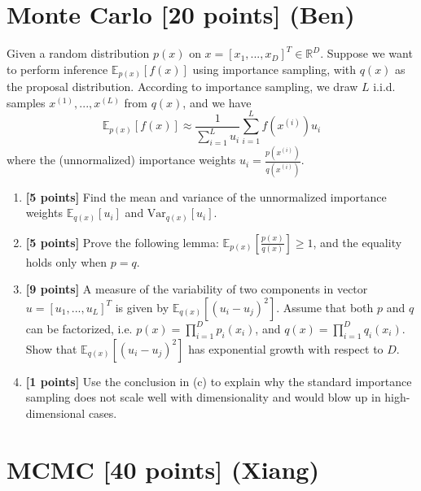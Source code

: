 \documentclass{article}
\begin{document}
\newpage
\section{Monte Carlo [20 points] (Ben)}

Given a random distribution $p(x)$ on $x = [x_1, ..., x_D]^T \in \mathbb{R}^D$. Suppose we want to perform inference $\mathbb{E}_{p(x)}[f(x)]$ using importance sampling, with $q(x)$ as the proposal distribution. According to importance sampling, we draw $L$ i.i.d. samples $x^{(1)}, ..., x^{(L)}$ from $q(x)$, and we have $$\mathbb{E}_{p(x)}[f(x)] \approx \frac{1}{\sum_{i=1}^L u_i}\sum_{i = 1}^{L} f(x^{(i)})u_i$$
where the (unnormalized) importance weights $u_i = \frac{p(x^{(i)})}{q(x^{(i)})}$.

\begin{enumerate}
\item \textbf{[5 points]} Find the mean and variance of the unnormalized importance weights $\mathbb{E}_{q(x)}\left[u_i\right]$ and $\text{Var}_{q(x)}\left[u_i\right]$.

\item \textbf{[5 points]} Prove the following lemma: $\mathbb{E}_{p(x)}\left[\frac{p(x)}{q(x)}\right] \geq 1$, and the equality holds only when $p = q$. 

\item \textbf{[9 points]} A measure of the variability of two components in vector $u = [u_1, ..., u_L]^T$ is given by $\mathbb{E}_{q(x)}\left[ (u_i - u_j)^2 \right]$. Assume that both $p$ and $q$ can be factorized, i.e. $p(x) = \prod_{i=1}^{D} p_i(x_i)$, and $q(x) = \prod_{i=1}^{D} q_i(x_i)$. Show that 
$\mathbb{E}_{q(x)}\left[ (u_i - u_j)^2 \right]$ has exponential growth with respect to $D$. \\

\item \textbf{[1 points]} Use the conclusion in (c) to explain why the standard importance sampling does not scale well with dimensionality and would blow up in high-dimensional cases. 
\end{enumerate}













\newpage

\section{MCMC [40 points] (Xiang)}
\end{document}
